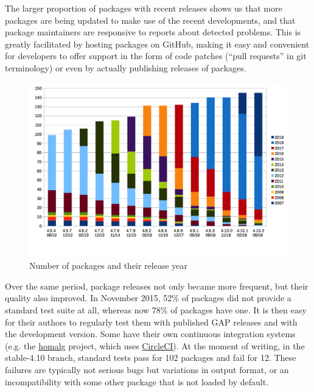 The larger proportion of packages with recent releases shows us that 
more packages are being updated to make use of the recent \GAP developments,
and that package maintainers are responsive to reports about detected problems.
This is greatly facilitated by hosting packages on GitHub, making it
easy and convenient for \GAP developers to offer support in the form
of code patches (``pull requests'' in git terminology) or even by
actually publishing releases of packages.

\begin{figure}[!ht]
    \centering
    \includegraphics[width=\textwidth]{images/gap-package-releases}
    \caption{Number of \GAP packages and their release year}
    \label{fig:gap-package-releases}
\end{figure}


Over the same period, package releases not only became more frequent,
but their quality also 
improved. In November 2015, 52\% of packages did not provide a standard 
test suite at all, whereas now 78\% of packages have one.
It is then easy for their authors to  regularly test them 
with published GAP releases and with the development version.
Some have their own continuous integration systems
(e.g. the \href{https://homalg-project.github.io/}{\sf homalg} project,
which uses \href{https://circleci.com/}{CircleCI}).
At the moment of writing, in the stable-4.10 branch,
standard tests pass for 102 packages
and fail for 12.
These failures are typically not serious bugs but variations in output
format, or an incompatibility with some other package
that is not loaded by default.

